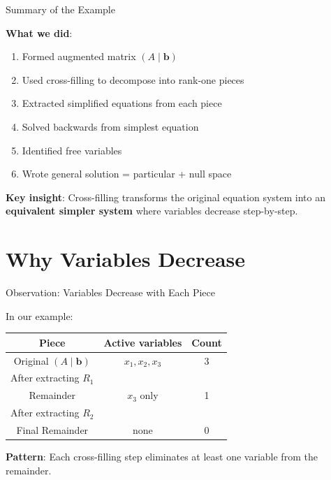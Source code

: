 \documentclass[10pt]{beamer}
\theoremstyle{definition}
\newcommand{\x}[1]{\alert{\textbf{#1}}}
\begin{document}
\begin{frame}{Summary of the Example}

\x{What we did}:
\begin{enumerate}
\item Formed augmented matrix $(A \mid \mathbf{b})$
\item Used cross-filling to decompose into rank-one pieces
\item Extracted simplified equations from each piece
\item Solved backwards from simplest equation
\item Identified free variables
\item Wrote general solution = particular + null space
\end{enumerate}

\vspace{1em}

\x{Key insight}: Cross-filling transforms the original equation system into an \textbf{equivalent simpler system} where variables decrease step-by-step.

\end{frame}

\section{Why Variables Decrease}

\begin{frame}{Observation: Variables Decrease with Each Piece}

In our example:

\vspace{1em}

\begin{center}
\begin{tabular}{c|c|c}
\textbf{Piece} & \textbf{Active variables} & \textbf{Count} \\
\hline
Original $(A \mid \mathbf{b})$ & $x_1, x_2, x_3$ & 3 \\
\hline
After extracting $R_1$ & & \\
Remainder & $x_3$ only & 1 \\
\hline
After extracting $R_2$ & & \\
Final Remainder & none & 0 \\
\end{tabular}
\end{center}

\vspace{1em}

\x{Pattern}: Each cross-filling step eliminates at least one variable from the remainder.

\end{frame}
\end{document}
